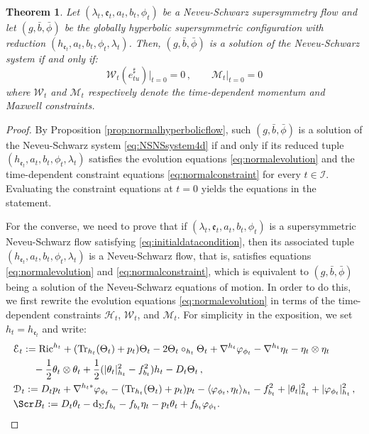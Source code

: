 \documentclass[10pt,reqno,a4paper]{amsart}
\theoremstyle{plain}
\newtheorem{thm}{Theorem}[section]
\theoremstyle{definition}
\theoremstyle{remark}
\theoremstyle{remark}
\def\dd{\mathrm{d}}
\newcommand{\Tr}{\mathrm{Tr}}
\def\cB{\Scr B}
\def\cH{\mathcal{H}}
\def\cD{\mathcal{D}}
\def\cE{\mathcal{E}}
\def\cI{\mathcal{I}}
\def\cM{\mathcal{M}}
\def\cW{\mathcal{W}}
\def\cH{\mathcal{H}}
\def\fre{\mathfrak{e}}
\newcommand{\Ric}{\mathrm{Ric}}
\renewcommand{\(}{ (}
\renewcommand{\)}{ )}
\begin{document}
\begin{thm}
\label{thm:susyflowcompatibility}
Let $(\lambda_t,\fre_t, a_t , b_t,\phi_t)$ be a Neveu-Schwarz supersymmetry flow and let $(g,\bar{b},\bar{\phi})$ be the globally hyperbolic supersymmetric configuration with reduction $(h_{\fre_t}, a_t , b_t,\phi_t,\lambda_t)$. Then, $(g,\bar{b},\bar{\phi})$ is a solution of the Neveu-Schwarz system if and only if:
\begin{equation}
\label{eq:initialdatacondition}
\cW_t(e^{\sharp}_{tu})\vert_{t=0} = 0 \, , \qquad  \cM_t\vert_{t=0} = 0
\end{equation}
where $\mathcal{W}_t$ and $\mathcal{M}_t$ respectively denote the time-dependent momentum and Maxwell constraints. 
\end{thm} 

 
\begin{proof}
By Proposition \ref{prop:normalhyperbolicflow}, such $(g,\bar{b},\bar{\phi})$ is a solution of the Neveu-Schwarz system \eqref{eq:NSNSsystem4d} if and only if its reduced tuple $(h_{\fre_t}, a_t , b_t,\phi_t,\lambda_t)$ satisfies the evolution equations \eqref{eq:normalevolution} and the time-dependent constraint equations \eqref{eq:normalconstraint} for every $t\in\cI$. Evaluating the constraint equations at $t=0$ yields the equations in the statement.

\noindent
For the converse, we need to prove that if $(\lambda_t,\fre_t, a_t , b_t,\phi_t)$ is a supersymmetric Neveu-Schwarz flow satisfying \eqref{eq:initialdatacondition}, then its associated tuple $(h_{\fre_t}, a_t , b_t,\phi_t,\lambda_t)$ is a Neveu-Schwarz flow, that is, satisfies equations  \eqref{eq:normalevolution} and \eqref{eq:normalconstraint}, which is equivalent to $(g,\bar{b},\bar{\phi})$ being a solution of the Neveu-Schwarz equations of motion. In order to do this, we first rewrite the evolution equations \eqref{eq:normalevolution} in terms of the time-dependent constraints $\cH_t$, $\cW_t$, and $\cM_t$. For simplicity in the exposition, we set $h_t=h_{\fre_t}$ and write: 
\begin{eqnarray*}
& \cE_t
:=\Ric^{h_t}
+(\Tr_{h_t}(\Theta_t)+p_t)\Theta_t
-2\Theta_t\circ_{h_t}\Theta_t
+\nabla^{h_t}\varphi_{\phi_t}
-\nabla^{h_t}\eta_t-\eta_t\otimes\eta_t\\
& \qquad
-\frac{1}{2}\theta_t\otimes\theta_t
+\frac{1}{2}
 (\vert\theta_t\vert_{h_t}^2-f_{b_t}^2 )h_t
-D_t\Theta_t\, ,\\
& \cD_t
:=D_tp_t+\nabla^{h_t\ast}\varphi_{\phi_t}
-(\Tr_{h_t}(\Theta_t)+p_t)p_t
-\langle\varphi_{\phi_t},\eta_t\rangle_{h_t}
-f_{b_t}^2+\vert\theta_t\vert_{h_t}^2
+\vert\varphi_{\phi_t}\vert_{h_t}^2\, ,\\
& \cB_t
:=D_t\theta_t-\dd_{\Sigma}f_{b_t}
-f_{b_t}\eta_t-p_t\theta_t+f_{b_t}\varphi_{\phi_t}.
\end{eqnarray*}


\end{proof}
\end{document}
